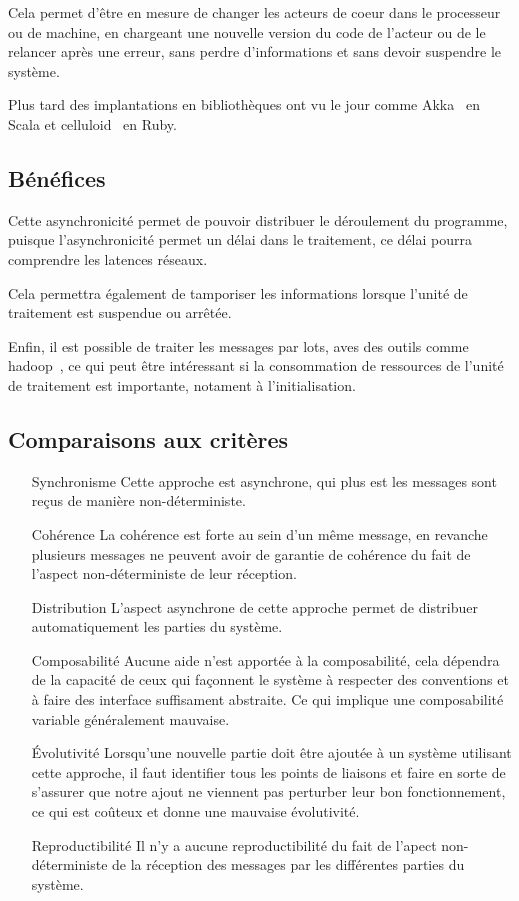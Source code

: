 \documentclass{article}
\begin{document}
Cela permet d'être en mesure de changer les acteurs de coeur dans le processeur ou
de machine, en chargeant une nouvelle version du code de l'acteur ou de le relancer
après une erreur, sans perdre d'informations et sans devoir suspendre le système.

Plus tard des implantations en bibliothèques ont vu le jour comme Akka~\cite{akka}
en Scala et celluloid~\cite{celluloid} en Ruby.

\subsection{Bénéfices}\label{bénéfices}
Cette asynchronicité permet de pouvoir distribuer le déroulement du programme,
puisque l'asynchronicité permet un délai dans le traitement, ce délai pourra comprendre
les latences réseaux.

Cela permettra également de tamporiser les informations lorsque l'unité de
traitement est suspendue ou arrêtée.

Enfin, il est possible de traiter les messages par lots, aves des outils comme hadoop~\cite{hadoop},
ce qui peut être intéressant si la consommation de ressources de l'unité de traitement
est importante, notament à l'initialisation.

\subsection{Comparaisons aux critères}
\begin{itemize}
    \item[Synchronisme] Cette approche est asynchrone, qui plus est les messages
sont reçus de  manière non-déterministe.
    \item[Cohérence] La cohérence est forte au sein d'un même message, en revanche
plusieurs messages ne peuvent avoir de garantie de cohérence du fait de l'aspect
non-déterministe de leur réception.
    \item[Distribution] L'aspect asynchrone de cette approche permet de distribuer
automatiquement les parties du système.  
    \item[Composabilité] Aucune aide n'est apportée à la composabilité, cela dépendra
de la capacité de ceux qui façonnent le système à respecter des conventions et à
faire des interface suffisament abstraite. Ce qui implique une composabilité variable
généralement mauvaise.
    \item[Évolutivité] Lorsqu'une nouvelle partie doit être ajoutée à un système
utilisant cette approche, il faut identifier tous les points de liaisons et faire
en sorte de s'assurer que notre ajout ne viennent pas perturber leur bon fonctionnement,
ce qui est coûteux et donne une mauvaise évolutivité.
    \item[Reproductibilité] Il n'y a aucune reproductibilité du fait de l'apect
non-déterministe de la réception des messages par les différentes parties du système.
\end{itemize}
\end{document}
